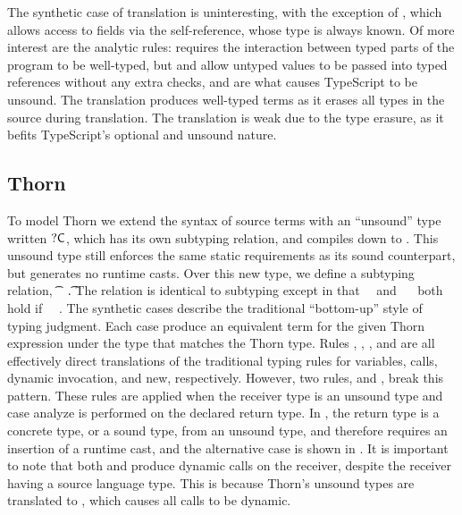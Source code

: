 \documentclass[a4paper,USenglish]{tex/lipics-v2016}
\begin{document}
The synthetic case of translation is uninteresting, with the exception of
, which allows access to fields via the self-reference, whose
type is always known.  Of more interest are the analytic rules:
 requires the interaction between typed parts of the program
to be well-typed, but  and  allow untyped values
to be passed into typed references without any extra checks, and are what
causes TypeScript to be unsound.  The translation produces well-typed terms
as it erases all types in the source during translation. The translation is
weak due to the type erasure, as it befits TypeScript's optional and unsound
nature. 


\newpage

\subsection{Thorn}

To model Thorn we extend the syntax of source terms with an ``unsound'' type
written ${\sf{?}}{\sf{C}}$, which has its own subtyping relation, and compiles down to
\any. This unsound type still enforces the same static requirements as its
sound counterpart, but generates no runtime casts.  Over this new type, we
define a subtyping relation, \t~\src\Sub~\t. The relation is identical to
\kafka subtyping except in that \dt\C~\src\Sub~\dt\D and \C~\src\Sub~\dt\D
both hold if \C~\src\Sub~\D.  The synthetic cases describe the traditional
``bottom-up'' style of typing judgment. Each case produce an equivalent
\kafka term for the given Thorn expression under the \kafka type that
matches the Thorn type. Rules , ,
, and  are all effectively direct translations
of the traditional typing rules for variables, calls, dynamic invocation,
and new, respectively.  However, two rules,  and
, break this pattern. These rules are applied when the
receiver type is an unsound type and case analyze is performed on the
declared return type. In , the return type is a concrete type,
or a sound type, from an unsound type, and therefore requires an insertion
of a runtime cast, and the alternative case is shown in . It
is important to note that both  and  produce
dynamic calls on the receiver, despite the receiver having a source language
type. This is because Thorn's unsound types are translated to \any, which
causes all calls to be dynamic.
\end{document}
